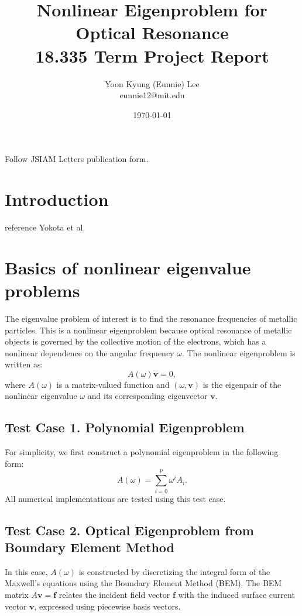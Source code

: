 \documentclass[11pt,letterpaper]{article}
\author{Yoon Kyung (Eunnie) Lee \\eunnie12@mit.edu}
\title{\textbf{Nonlinear Eigenproblem for Optical Resonance}\\18.335 Term Project Report}
\date{\today}
\begin{document}
\maketitle

\begin{multicols}{2}
Follow JSIAM Letters publication form. 

\section{Introduction}
reference Yokota et al. 

\section{Basics of nonlinear eigenvalue problems}
The eigenvalue problem of interest is to find the resonance frequencies of metallic particles. This is a nonlinear eigenproblem because optical resonance of metallic objects is governed by the collective motion of the electrons, which has a nonlinear dependence on the angular frequency $\omega$. The nonlinear eigenproblem is written as:
\begin{equation}\label{eq:Eig}
    A(\omega) \mathbf{v} = 0,
\end{equation}
where $A(\omega)$ is a matrix-valued function and $(\omega, \mathbf{v})$ is the eigenpair of the nonlinear eigenvalue $\omega$ and its corresponding eigenvector $\mathbf{v}$. 
\subsection*{Test Case 1. Polynomial Eigenproblem}
For simplicity, we first construct a polynomial eigenproblem in the following form:
\begin{equation}\label{eq:polyeig}
A(\omega)=\sum\limits_{i=0}^{p}\omega^iA_i.
\end{equation}
All numerical implementations are tested using this test case. 
\subsection*{Test Case 2. Optical Eigenproblem from Boundary Element Method}
In this case, $A(\omega)$ is constructed by discretizing the integral form of the Maxwell's equations using the Boundary Element Method (BEM). The BEM matrix $A\mathbf{v}=\mathbf{f}$ relates the incident field vector $\mathbf{f}$ with the induced surface current vector $\mathbf{v}$, expressed using piecewise basis vectors. 


\end{multicols}
\end{document}
